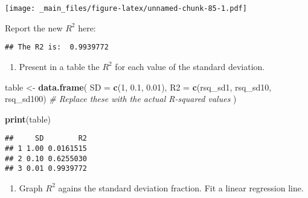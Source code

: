 \documentclass[
]{book}
\newenvironment{Shaded}{\begin{snugshade}}{\end{snugshade}}
\newcommand{\AttributeTok}[1]{\textcolor[rgb]{0.13,0.29,0.53}{#1}}
\newcommand{\CommentTok}[1]{\textcolor[rgb]{0.56,0.35,0.01}{\textit{#1}}}
\newcommand{\DecValTok}[1]{\textcolor[rgb]{0.00,0.00,0.81}{#1}}
\newcommand{\FloatTok}[1]{\textcolor[rgb]{0.00,0.00,0.81}{#1}}
\newcommand{\FunctionTok}[1]{\textcolor[rgb]{0.13,0.29,0.53}{\textbf{#1}}}
\newcommand{\NormalTok}[1]{#1}
\newcommand{\OtherTok}[1]{\textcolor[rgb]{0.56,0.35,0.01}{#1}}
\newcommand{\SpecialCharTok}[1]{\textcolor[rgb]{0.81,0.36,0.00}{\textbf{#1}}}
\newcommand{\StringTok}[1]{\textcolor[rgb]{0.31,0.60,0.02}{#1}}
\providecommand{\tightlist}{%
  \setlength{\itemsep}{0pt}\setlength{\parskip}{0pt}}
\begin{document}
\texttt{[image: \_main\_files/figure-latex/unnamed-chunk-85-1.pdf]}

Report the new \(R^2\) here:

\begin{Shaded}
\end{Shaded}

\begin{verbatim}
## The R2 is:  0.9939772
\end{verbatim}

\begin{enumerate}
\def\labelenumi{\arabic{enumi}.}
\setcounter{enumi}{6}
\tightlist
\item
  Present in a table the \(R^2\) for each value of the standard deviation.
\end{enumerate}

\begin{Shaded}
\begin{Highlighting}[]
\NormalTok{table }\OtherTok{\textless{}{-}} \FunctionTok{data.frame}\NormalTok{(}
  \AttributeTok{SD =} \FunctionTok{c}\NormalTok{(}\DecValTok{1}\NormalTok{, }\FloatTok{0.1}\NormalTok{, }\FloatTok{0.01}\NormalTok{),}
  \AttributeTok{R2 =} \FunctionTok{c}\NormalTok{(rsq\_sd1, rsq\_sd10, rsq\_sd100)    }\CommentTok{\# Replace these with the actual R{-}squared values}
\NormalTok{)}

\FunctionTok{print}\NormalTok{(table)}
\end{Highlighting}
\end{Shaded}

\begin{verbatim}
##     SD        R2
## 1 1.00 0.0161515
## 2 0.10 0.6255030
## 3 0.01 0.9939772
\end{verbatim}

\begin{enumerate}
\def\labelenumi{\arabic{enumi}.}
\setcounter{enumi}{7}
\tightlist
\item
  Graph \(R^2\) agains the standard deviation fraction. Fit a linear regression line.
\end{enumerate}
\end{document}
